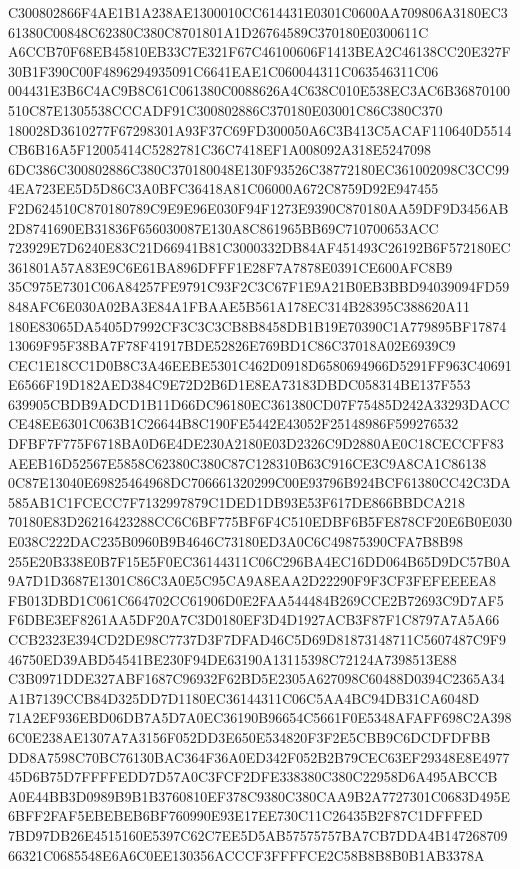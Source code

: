 \documentclass[UTF8,fontset=fandol,zihao=-4,a4paper]{ctexart}
\begin{document}
{{C300802866F4AE1B1A238AE1300010CC614431E0301C0600AA709806A3180EC361380C00848C62380C380C8701801A1D26764589C370180E0300611C
A6CCB70F68EB45810EB33C7E321F67C46100606F1413BEA2C46138CC20E327F30B1F390C00F4896294935091C6641EAE1C060044311C063546311C06
004431E3B6C4AC9B8C61C061380C0088626A4C638C010E538EC3AC6B36870100510C87E1305538CCCADF91C300802886C370180E03001C86C380C370
180028D3610277F67298301A93F37C69FD300050A6C3B413C5ACAF110640D5514CB6B16A5F12005414C5282781C36C7418EF1A008092A318E5247098
6DC386C300802886C380C370180048E130F93526C38772180EC361002098C3CC994EA723EE5D5D86C3A0BFC36418A81C06000A672C8759D92E947455
F2D624510C870180789C9E9E96E030F94F1273E9390C870180AA59DF9D3456AB2D8741690EB31836F656030087E130A8C861965BB69C710700653ACC
723929E7D6240E83C21D66941B81C3000332DB84AF451493C26192B6F572180EC361801A57A83E9C6E61BA896DFFF1E28F7A7878E0391CE600AFC8B9
35C975E7301C06A84257FE9791C93F2C3C67F1E9A21B0EB3BBD94039094FD59848AFC6E030A02BA3E84A1FBAAE5B561A178EC314B28395C388620A11
180E83065DA5405D7992CF3C3C3CB8B8458DB1B19E70390C1A779895BF1787413069F95F38BA7F78F41917BDE52826E769BD1C86C37018A02E6939C9
CEC1E18CC1D0B8C3A46EEBE5301C462D0918D6580694966D5291FF963C40691E6566F19D182AED384C9E72D2B6D1E8EA73183DBDC058314BE137F553
639905CBDB9ADCD1B11D66DC96180EC361380CD07F75485D242A33293DACCCE48EE6301C063B1C26644B8C190FE5442E43052F25148986F599276532
DFBF7F775F6718BA0D6E4DE230A2180E03D2326C9D2880AE0C18CECCFF83AEEB16D52567E5858C62380C380C87C128310B63C916CE3C9A8CA1C86138
0C87E13040E69825464968DC706661320299C00E93796B924BCF61380CC42C3DA585AB1C1FCECC7F7132997879C1DED1DB93E53F617DE866BBDCA218
70180E83D26216423288CC6C6BF775BF6F4C510EDBF6B5FE878CF20E6B0E030E038C222DAC235B0960B9B4646C73180ED3A0C6C49875390CFA7B8B98
255E20B338E0B7F15E5F0EC36144311C06C296BA4EC16DD064B65D9DC57B0A9A7D1D3687E1301C86C3A0E5C95CA9A8EAA2D22290F9F3CF3FEFEEEEA8
FB013DBD1C061C664702CC61906D0E2FAA544484B269CCE2B72693C9D7AF5F6DBE3EF8261AA5DF20A7C3D0180EF3D4D1927ACB3F87F1C8797A7A5A66
CCB2323E394CD2DE98C7737D3F7DFAD46C5D69D81873148711C5607487C9F946750ED39ABD54541BE230F94DE63190A13115398C72124A7398513E88
C3B0971DDE327ABF1687C96932F62BD5E2305A627098C60488D0394C2365A34A1B7139CCB84D325DD7D1180EC36144311C06C5AA4BC94DB31CA6048D
71A2EF936EBD06DB7A5D7A0EC36190B96654C5661F0E5348AFAFF698C2A3986C0E238AE1307A7A3156F052DD3E650E534820F3F2E5CBB9C6DCDFDFBB
DD8A7598C70BC76130BAC364F36A0ED342F052B2B79CEC63EF29348E8E497745D6B75D7FFFFEDD7D57A0C3FCF2DFE338380C380C22958D6A495ABCCB
A0E44BB3D0989B9B1B3760810EF378C9380C380CAA9B2A7727301C0683D495E6BFF2FAF5EBEBEB6BF760990E93E17EE730C11C26435B2F87C1DFFFED
7BD97DB26E4515160E5397C62C7EE5D5AB57575757BA7CB7DDA4B14726870966321C0685548E6A6C0EE130356ACCCF3FFFFCE2C58B8B8B0B1AB3378A
}}
\end{document}

